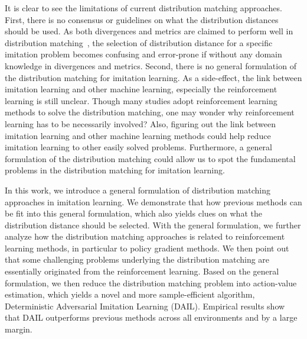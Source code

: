 It is clear to see the limitations of current distribution matching approaches.
First, there is no consensus or guidelines on what the distribution distances should be used. 
As both divergences and metrics are claimed to perform well in distribution matching~\cite{ke2019imitation,ghasemipour2020divergence,xiao2019wasserstein}, the selection of distribution distance for a specific imitation problem becomes confusing and error-prone if without any domain knowledge in divergences and metrics.
Second, there is no general formulation of the distribution matching for imitation learning. 
As a side-effect, the link between imitation learning and other machine learning, especially the reinforcement learning is still unclear. 
Though many studies adopt reinforcement learning methods to solve the distribution matching, 
one may wonder why reinforcement learning has to be necessarily involved?
Also, figuring out the link between imitation learning and other machine learning methods could help reduce imitation learning to other easily solved problems. 
Furthermore, a general formulation of the distribution matching could allow us to spot the fundamental problems in the distribution matching for imitation learning. 


In this work, we introduce a general formulation of distribution matching approaches in imitation learning. 
We demonstrate that how previous methods can be fit into this general formulation, 
which also yields clues on what the distribution distance should be selected. 
With the general formulation, we further analyze how the distribution matching approaches is related to reinforcement learning methods, in particular to policy gradient methods. 
We then point out that some challenging problems underlying the distribution matching are essentially originated from the reinforcement learning. 
Based on the general formulation, we then reduce the distribution matching problem into action-value estimation, which yields a novel and more sample-efficient algorithm, Deterministic Adversarial Imitation Learning (DAIL). 
Empirical results show that DAIL outperforms previous methods across all environments and by a large margin. 
